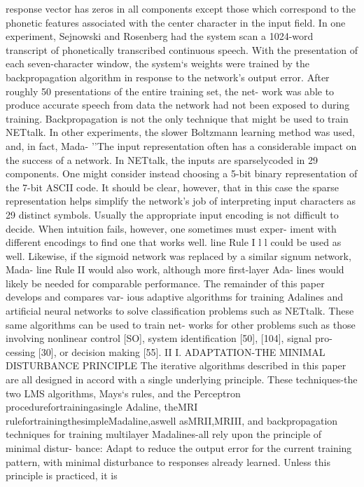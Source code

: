 response vector has zeros in all components except those which
correspond to the phonetic features associated with the center character
in the input field. In one experiment, Sejnowski and Rosenberg had the
system scan a 1024-word transcript of phonetically transcribed
continuous speech. With the presentation of each seven-character window,
the system`s weights were trained by the backpropagation algorithm in
response to the network's output error. After roughly 50 presentations
of the entire training set, the net- work was able to produce accurate
speech from data the network had not been exposed to during training.
Backpropagation is not the only technique that might be used to train
NETtalk. In other experiments, the slower Boltzmann learning method was
used, and, in fact, Mada- ''The input representation often has a
considerable impact on the success of a network. In NETtalk, the inputs
are sparselycoded in 29 components. One might consider instead choosing
a 5-bit binary representation of the 7-bit ASCII code. It should be
clear, however, that in this case the sparse representation helps
simplify the network's job of interpreting input characters as 29
distinct symbols. Usually the appropriate input encoding is not
difficult to decide. When intuition fails, however, one sometimes must
exper- iment with different encodings to find one that works well. line
Rule I l l could be used as well. Likewise, if the sigmoid network was
replaced by a similar signum network, Mada- line Rule II would also
work, although more first-layer Ada- lines would likely be needed for
comparable performance. The remainder of this paper develops and
compares var- ious adaptive algorithms for training Adalines and
artificial neural networks to solve classification problems such as
NETtalk. These same algorithms can be used to train net- works for other
problems such as those involving nonlinear control {[}SO{]}, system
identification {[}50{]}, {[}104{]}, signal pro- cessing {[}30{]}, or
decision making {[}55{]}. II I. ADAPTATION-THE MINIMAL DISTURBANCE
PRINCIPLE The iterative algorithms described in this paper are all
designed in accord with a single underlying principle. These
techniques-the two LMS algorithms, Mays`s rules, and the Perceptron
procedurefortrainingasingle Adaline, theMRI
rulefortrainingthesimpleMadaline,aswell asMRII,MRIII, and
backpropagation techniques for training multilayer Madalines-all rely
upon the principle of minimal distur- bance: Adapt to reduce the output
error for the current training pattern, with minimal disturbance to
responses already learned. Unless this principle is practiced, it is
